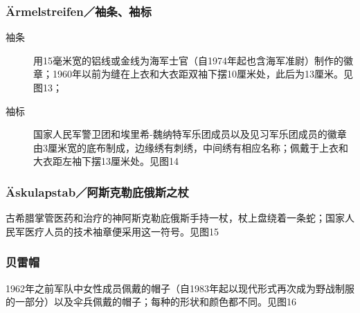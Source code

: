 \subsubsection*{Ärmelstreifen／袖条、袖标}

\begin{description}

    \item[袖条] 用15毫米宽的铝线或金线为海军士官（自1974年起也含海军准尉）制作的徽章；1960年以前为缝在上衣和大衣距双袖下摆10厘米处，此后为13厘米。见图13；

    \item[袖标] 国家人民军警卫团和埃里希-魏纳特军乐团成员以及见习军乐团成员的徽章由3厘米宽的底布制成，边缘绣有刺绣，中间绣有相应名称；佩戴于上衣和大衣距左袖下摆13厘米处。见图14

\end{description}

\subsubsection*{Äskulapstab／阿斯克勒庇俄斯之杖}%

古希腊掌管医药和治疗的神阿斯克勒庇俄斯手持一杖，杖上盘绕着一条蛇；国家人民军医疗人员的技术袖章便采用这一符号。见图15

\subsubsection*{贝雷帽}%

1962年之前军队中女性成员佩戴的帽子（自1983年起以现代形式再次成为野战制服的一部分）以及伞兵佩戴的帽子；每种的形状和颜色都不同。见图16

